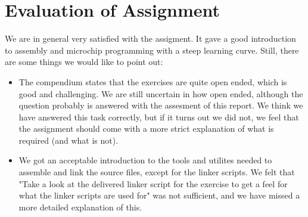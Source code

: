 \section{Evaluation of Assignment}
We are in general very satisfied with the assigment. It gave a good introduction to assembly and microchip programming with a steep learning curve. Still, there are some things we would like to point out:
\begin{itemize}
	\item The compendium states that the exercises are quite open ended, which is good and challenging. We are still uncertain in how open ended, although the question probably is answered with the assesment of this report. We think we have answered this task correctly, but if it turns out we did not, we feel that the assignment should come with a more strict explanation of what is required (and what is not).
	\item We got an acceptable introduction to the tools and utilites needed to assemble and link the source files, except for the linker scripts. We felt that "Take a look at the delivered linker script for the exercise to get a feel for what the linker scripts are used for" was not sufficient, and we have missed a more detailed explanation of this.
\end{itemize}
